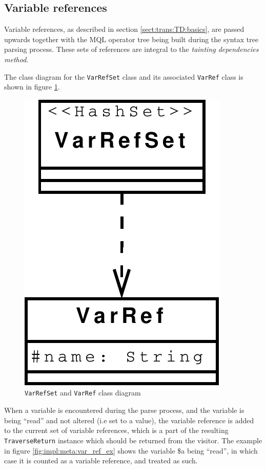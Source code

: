 \subsection{Variable references}
Variable references, as described in section \ref{sect:trans:TD:basics}, are
passed upwards together with the MQL operator tree being built during the syntax
tree parsing process. These sets of references are integral to the
\textit{tainting dependencies method}.

The class diagram for the \texttt{VarRefSet} class and its associated
\texttt{VarRef} class is shown in figure \ref{fig:impl:meta:varrefset_uml}.

\begin{figure}[!htp]
\begin{center}
  \includegraphics[scale=0.5]{diagrams/varrefset_uml}
  \caption{\texttt{VarRefSet} and \texttt{VarRef} class diagram}
  \label{fig:impl:meta:varrefset_uml}
\end{center}
\end{figure}

When a variable is encountered during the parse process, and the variable is
being ``read'' and not altered (i.e set to a value), the variable reference is
added to the current set of variable references, which is a part of the resulting
\texttt{TraverseReturn} instance which should be returned from the visitor.
The example in figure \ref{fig:impl:meta:var_ref_ex} shows the variable \$a
being ``read'', in which case it is counted as a variable reference, and
treated as such.

